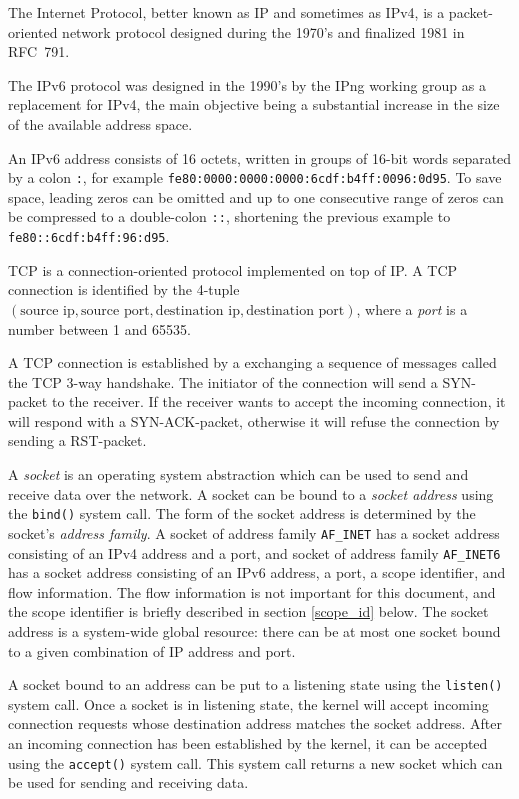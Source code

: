 \documentclass{scrreprt}
\begin{document}
The Internet Protocol, better known as IP and sometimes as IPv4, is a
packet-oriented network protocol designed during the 1970's and finalized
1981 in RFC~791.

The IPv6 protocol was designed in the 1990's by the IPng working group as a
replacement for IPv4, the main objective being a substantial increase in the
size of the available address space.

An IPv6 address consists of 16 octets, written in groups of 16-bit words
separated by a colon \texttt{:}, for example \texttt{fe80:0000:0000:0000:6cdf:b4ff:0096:0d95}.
To save space, leading zeros can be omitted and up to one consecutive range of zeros can
be compressed to a double-colon \texttt{::}, shortening the previous example to
\texttt{fe80::6cdf:b4ff:96:d95}.

TCP is a connection-oriented protocol implemented on top of IP. A TCP connection
is identified by the 4-tuple $(\text{source ip}, \text{source port}, \text{destination ip}, \text{destination port})$,
where a \emph{port} is a number between 1 and 65535.

A TCP connection is established by a exchanging a sequence of messages called the
TCP 3-way handshake. The initiator of the connection will send a SYN-packet to
the receiver. If the receiver wants to accept the incoming connection, it will
respond with a SYN-ACK-packet, otherwise it will refuse the connection by
sending a RST-packet.

A \emph{socket} is an operating system abstraction which can be used to send and receive
data over the network. A socket can be bound to a \emph{socket address} using the \texttt{bind()}
system call. The form of the socket address is determined by the socket's \emph{address family}.
A socket of address family \texttt{AF\_INET}
has a socket address consisting of an IPv4 address and a port, and socket of address
family \texttt{AF\_INET6} has a socket address consisting of an IPv6 address, a port, a
scope identifier, and flow information. The flow information is not important for this document,
and the scope identifier is briefly described in section \ref{scope_id} below.
The socket address is a system-wide global resource:
there can be at most one socket bound to a given combination of IP address and port.

A socket bound to an address can be put to a listening state using the \texttt{listen()}
system call.
Once a socket is in listening state, the kernel will accept incoming connection requests whose
destination address matches the socket address.
After an incoming connection has been established by the kernel, it can be accepted using the
\texttt{accept()} system call. This system call returns a new socket which can be used for
sending and receiving data.
\end{document}
